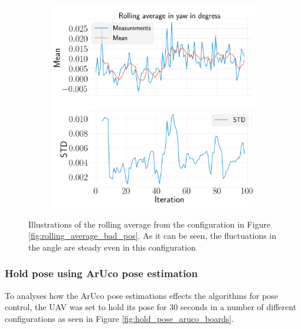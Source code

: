 \documentclass[../Head/report.tex]{subfiles}
\begin{document}
\begin{figure}[H]
\begin{subfigure}[t]{.30\textwidth}
        \caption{}
        \label{fig:rolling_average_in_pitch_test2}
    \end{subfigure}
     \hspace{0.2em}
    \begin{subfigure}[t]{.30\textwidth}
        \centering
        \includegraphics[width=\textwidth]{../Figures/analyse_rolling_average/test2/Calculated_rolling_average_in_yaw_with_mean_and_STD.png}
        \caption{}
        \label{fig:rolling_average_in_yaw_test2}
    \end{subfigure}
    \caption{Illustrations of the rolling average from the configuration in Figure \ref{fig:rolling_average_bad_pos}. As it can be seen, the fluctuations in the angle are steady even in this configuration}
    \label{fig:rolling_average_angle_test2}
\end{figure}  

\subsubsection{Hold pose using ArUco pose estimation}
\label{sec:hold_pose_using_aruco_pose_estimation}

To analyses how the ArUco pose estimations effects the algorithms for pose control, the UAV was set to hold its pose for 30 seconds in a number of different configurations as seen in Figure \ref{fig:hold_pose_aruco_boards}. 
\end{document}
